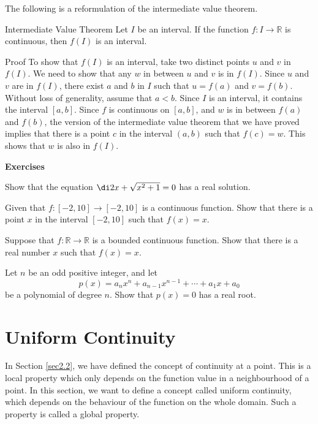 \begin{example}
The following is a   reformulation of the intermediate value theorem.
\begin{theorem}{Intermediate Value Theorem}
Let $I$ be an interval. If the function $f:I\rightarrow\mathbb{R}$ is continuous, then $f(I)$ is an interval.
\end{theorem}
\begin{myproof}{Proof}
To show that $f(I)$ is an interval, take two distinct points $u$ and $v$ in $f(I)$. We need to show that any $w$ in between $u$ and $v$ is in $f(I)$. Since $u$ and $v$ are in $f(I)$, there exist $a$ and $b$ in $I$ such that $u=f(a)$ and $v=f(b)$. Without loss of generality, assume that $a<b$. Since $I$ is an interval, it contains the interval $[a,b]$. Since $f$ is continuous on $[a,b]$, and $w$ is in between $f(a)$ and $f(b)$,    the version of the intermediate value theorem that we have proved implies that there is a point $c$ in the interval $(a, b)$ such that $f(c)=w$. This shows that $w$ is also in $f(I)$.

 
\end{myproof}

\vp
\noindent
{\bf \large Exercises  \thesection}
\setcounter{myquestion}{1}
 \begin{question}{\themyquestion}
 Show that the equation 
$\di 2x+\sqrt{x^2+1}=0$ has a real solution.
\end{question}

\atc
\begin{question}{\themyquestion}
Given that $f:[-2, 10]\to [-2, 10]$ is a continuous function.
Show that there is a point $x$ in the interval $[-2, 10]$ such that $f(x)=x$.
\end{question}

\atc
\begin{question}{\themyquestion}
Suppose that $f:\mathbb{R}\rightarrow \mathbb{R}$ is a bounded continuous function.  Show that there is a real number $x$  such that $f(x)=x$.
\end{question}
\atc
\begin{question}{\themyquestion}
Let $n$ be an odd positive integer, and let \[p(x)=a_nx^n+a_{n-1}x^{n-1}+\cdots+a_1x+a_0\] be a polynomial of degree $n$. 
Show that $p(x)=0$ has a real root.
\end{question}
\vp

\section{Uniform Continuity}\label{sec2.5}
In Section \ref{sec2.2}, we have defined the concept of continuity at a point. This is a local property which only depends on the function value in a neighbourhood of a point. In this section, we want to define a concept called uniform continuity, which depends on the behaviour of the function on the whole domain. Such a property is called a global property.


\end{example}

